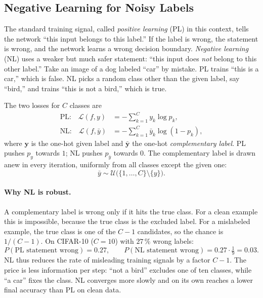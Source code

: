 \subsection{Negative Learning for Noisy Labels}

The standard training signal, called \emph{positive learning} (PL) in this
context, tells the network ``this input belongs to this label.'' If the label
is wrong, the statement is wrong, and the network learns a wrong decision
boundary. \emph{Negative learning} (NL) uses a weaker but much safer
statement: ``this input does \emph{not} belong to this other label.'' Take an
image of a dog labeled ``car'' by mistake. PL trains ``this is a car,'' which
is false. NL picks a random class other than the given label, say ``bird,''
and trains ``this is not a bird,'' which is true.

The two losses for $C$ classes are
\begin{align}
  \text{PL:}\quad \mathcal L(f,y) &= -\sum_{k=1}^{C} y_k\log p_k ,
  \label{eq:pl}\\
  \text{NL:}\quad \mathcal L(f,\bar y) &= -\sum_{k=1}^{C} \bar y_k\log(1-p_k) ,
  \label{eq:nl}
\end{align}
where $\mathbf y$ is the one-hot given label and $\bar{\mathbf y}$ the one-hot
\emph{complementary label}. PL pushes $p_y$ towards $1$; NL pushes
$p_{\bar y}$ towards $0$. The complementary label is drawn anew in every
iteration, uniformly from all classes except the given one:
\begin{equation}
  \bar y \sim \mathcal U\bigl(\{1,\dots,C\}\setminus\{y\}\bigr).
\end{equation}

\paragraph{Why NL is robust.}
A complementary label is wrong only if it hits the true class. For a clean
example this is impossible, because the true class is the excluded label.
For a mislabeled example, the true class is one of the $C-1$ candidates, so
the chance is $1/(C-1)$. On CIFAR-10 ($C=10$) with $27\,\%$ wrong labels:
\begin{equation*}
  P(\text{PL statement wrong}) = 0.27,
  \qquad
  P(\text{NL statement wrong}) = 0.27\cdot\tfrac19 = 0.03 .
\end{equation*}
NL thus reduces the rate of misleading training signals by a factor $C-1$.
The price is less information per step: ``not a bird'' excludes one of ten
classes, while ``a car'' fixes the class. NL converges more slowly and on
its own reaches a lower final accuracy than PL on clean data.

